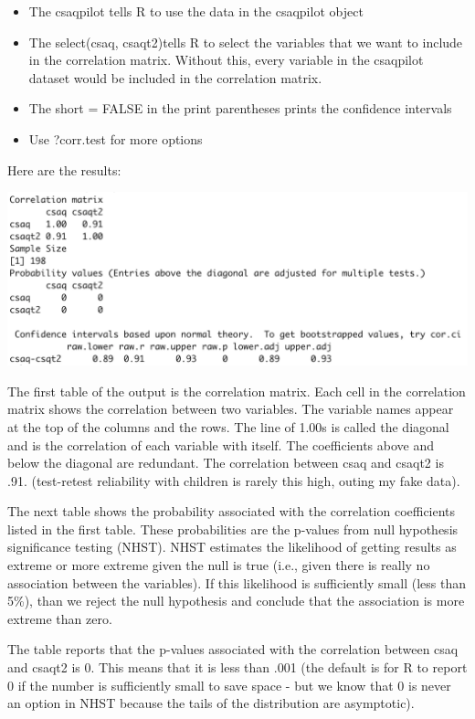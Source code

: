 \documentclass[
]{book}
\providecommand{\tightlist}{%
  \setlength{\itemsep}{0pt}\setlength{\parskip}{0pt}}
\begin{document}
\begin{itemize}
\tightlist
\item
  The csaqpilot tells R to use the data in the csaqpilot object\\
\item
  The select(csaq, csaqt2)tells R to select the variables that we want to include in the correlation matrix. Without this, every variable in the csaqpilot dataset would be included in the correlation matrix.\\
\item
  The short = FALSE in the print parentheses prints the confidence intervals\\
\item
  Use ?corr.test for more options
\end{itemize}

Here are the results:

\includegraphics{img/4R.6.png}

The first table of the output is the correlation matrix. Each cell in the correlation matrix shows the correlation between two variables. The variable names appear at the top of the columns and the rows. The line of 1.00s is called the diagonal and is the correlation of each variable with itself. The coefficients above and below the diagonal are redundant. The correlation between csaq and csaqt2 is .91. (test-retest reliability with children is rarely this high, outing my fake data).

The next table shows the probability associated with the correlation coefficients listed in the first table. These probabilities are the p-values from null hypothesis significance testing (NHST). NHST estimates the likelihood of getting results as extreme or more extreme given the null is true (i.e., given there is really no association between the variables). If this likelihood is sufficiently small (less than 5\%), than we reject the null hypothesis and conclude that the association is more extreme than zero.

The table reports that the p-values associated with the correlation between csaq and csaqt2 is 0. This means that it is less than .001 (the default is for R to report 0 if the number is sufficiently small to save space - but we know that 0 is never an option in NHST because the tails of the distribution are asymptotic).
\end{document}
